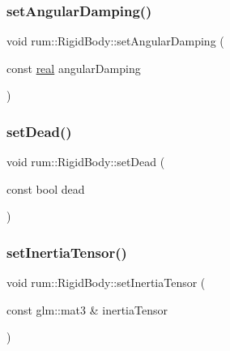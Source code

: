 \mbox{\label{classrum_1_1_rigid_body_a205cac5b6c9a0d7ce8371e94af3b95ee}} 
\subsubsection{\texorpdfstring{set\+Angular\+Damping()}{setAngularDamping()}}
{\footnotesize\ttfamily void rum\+::\+Rigid\+Body\+::set\+Angular\+Damping (\begin{DoxyParamCaption}\item[{const \hyperlink{namespacerum_a7e8cca23573d5eaead0f138cbaa4862c}{real}}]{angular\+Damping }\end{DoxyParamCaption})}

\mbox{\label{classrum_1_1_rigid_body_a253cfde1f35c821afcfef39ecf237428}} 
\subsubsection{\texorpdfstring{set\+Dead()}{setDead()}}
{\footnotesize\ttfamily void rum\+::\+Rigid\+Body\+::set\+Dead (\begin{DoxyParamCaption}\item[{const bool}]{dead }\end{DoxyParamCaption})}

\mbox{\label{classrum_1_1_rigid_body_a15fd4045586f493df7611c7d362bff16}} 
\subsubsection{\texorpdfstring{set\+Inertia\+Tensor()}{setInertiaTensor()}}
{\footnotesize\ttfamily void rum\+::\+Rigid\+Body\+::set\+Inertia\+Tensor (\begin{DoxyParamCaption}\item[{const glm\+::mat3 \&}]{inertia\+Tensor }\end{DoxyParamCaption})}

